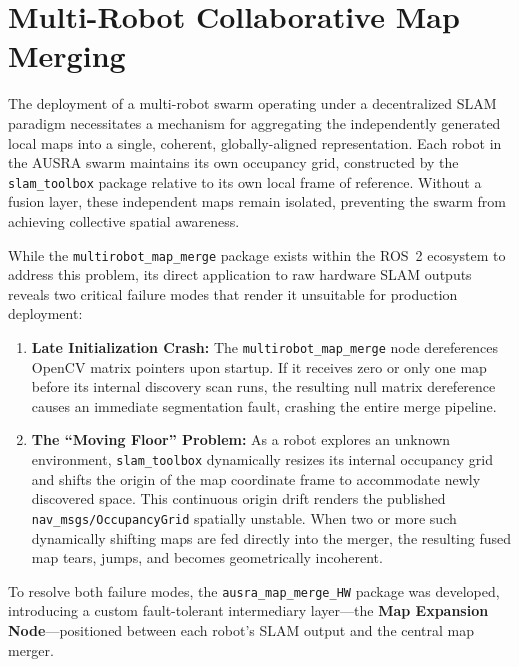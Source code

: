 \section{Multi-Robot Collaborative Map Merging}
\label{sec:collaborative_map_merge}
\label{sec:map_merge}

The deployment of a multi-robot swarm operating under a decentralized SLAM paradigm necessitates a mechanism for aggregating the independently generated local maps into a single, coherent, globally-aligned representation. Each robot in the AUSRA swarm maintains its own occupancy grid, constructed by the \texttt{slam\_toolbox} package relative to its own local frame of reference. Without a fusion layer, these independent maps remain isolated, preventing the swarm from achieving collective spatial awareness.

While the \texttt{multirobot\_map\_merge} package exists within the ROS~2 ecosystem to address this problem, its direct application to raw hardware SLAM outputs reveals two critical failure modes that render it unsuitable for production deployment:

\begin{enumerate}
    \item \textbf{Late Initialization Crash:} The \texttt{multirobot\_map\_merge} node dereferences OpenCV matrix pointers upon startup. If it receives zero or only one map before its internal discovery scan runs, the resulting null matrix dereference causes an immediate segmentation fault, crashing the entire merge pipeline.

    \item \textbf{The ``Moving Floor'' Problem:} As a robot explores an unknown environment, \texttt{slam\_toolbox} dynamically resizes its internal occupancy grid and shifts the origin of the map coordinate frame to accommodate newly discovered space. This continuous origin drift renders the published \texttt{nav\_msgs/OccupancyGrid} spatially unstable. When two or more such dynamically shifting maps are fed directly into the merger, the resulting fused map tears, jumps, and becomes geometrically incoherent.
\end{enumerate}

To resolve both failure modes, the \texttt{ausra\_map\_merge\_HW} package was developed, introducing a custom fault-tolerant intermediary layer---the \textbf{Map Expansion Node}---positioned between each robot's SLAM output and the central map merger.

